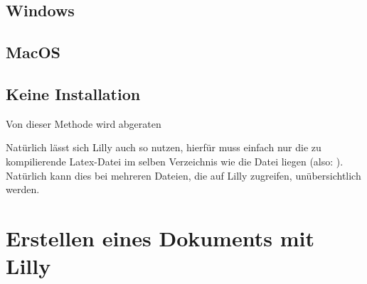 \subsection{Windows  }
\subsection{MacOS  }

\subsection{Keine Installation}
\begin{bemerkung}
    Von dieser Methode wird abgeraten
\end{bemerkung}
Natürlich lässt sich Lilly auch so nutzen, hierfür muss einfach nur die zu kompilierende Latex-Datei im selben Verzeichnis wie die Datei  liegen (also: ). Natürlich kann dies bei mehreren Dateien, die auf Lilly zugreifen, unübersichtlich werden.
\clearpage
\section[Erstellen eines Dokuments mit Lilly]{Erstellen eines Dokuments mit Lilly \tiny{}}
